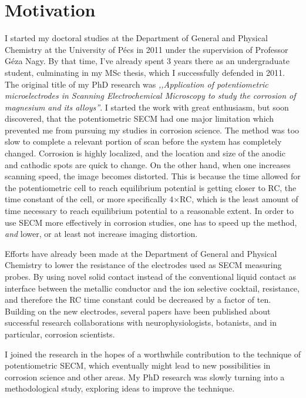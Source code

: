 \chapter*{Motivation}
I started my doctoral studies at the Department of General and Physical Chemistry at the University of Pécs in 2011 under the supervision of Professor Géza Nagy.
By that time, I've already spent 3 years there as an undergraduate student, culminating in my MSc thesis, which I successfully defended in 2011.
The original title of my PhD research was \emph{,,Application of potentiometric microelectrodes in Scanning Electrochemical Microscopy to study the corrosion of magnesium and its alloys''}.
I started the work with great enthusiasm, but soon discovered, that the potentiometric SECM had one major limitation which prevented me from pursuing my studies in corrosion science.
The method was too slow to complete a relevant portion of scan before the system has completely changed.
Corrosion is highly localized, and the location and size of the anodic and cathodic spots are quick to change.
On the other hand, when one increases scanning speed, the image becomes distorted.
This is because the time allowed for the potentiometric cell to reach equilibrium potential is getting closer to RC, the time constant of the cell, or more specifically 4$\times$RC, which is the least amount of time necessary to reach equilibrium potential to a reasonable extent.
In order to use SECM more effectively in corrosion studies, one has to speed up the method, \emph{and} lower, or at least not increase imaging distortion.

Efforts have already been made at the Department of General and Physical Chemistry to lower the resistance of the electrodes used as SECM measuring probes.
By using novel solid contact instead of the conventional liquid contact as interface between the metallic conductor and the ion selective cocktail, resistance, and therefore the RC time constant could be decreased by a factor of ten.
Building on the new electrodes, several papers have been published about successful research collaborations with neurophysiologists, botanists, and in particular, corrosion scientists.

I joined the research in the hopes of a worthwhile contribution to the technique of potentiometric SECM, which eventually might lead to new possibilities in corrosion science and other areas.
My PhD research was slowly turning into a methodological study, exploring ideas to improve the technique.

